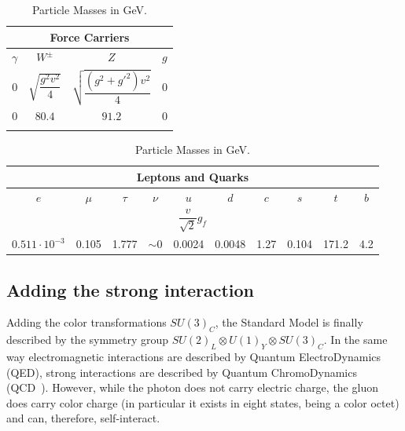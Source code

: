 \begin{table}[htb]\centering
\begin{tabular}{cccc}\toprule
\multicolumn{4}{c}{Force Carriers} \\ \midrule
$\gamma $ &$W^{\pm}$ &$Z$ &$g$ \\
$0$ & $\sqrt{\dfrac{g^{2}v^{2}}{4}} $& $\sqrt{\dfrac{(g^{2}+g'^{2})v^{2}}{4}} $&  $0$ \\
$0$ & $80.4$ & $91.2$ & $0$ \\\bottomrule\\
\end{tabular}
\begin{tabular}{cccccccccc}\toprule
\multicolumn{10}{c}{Leptons and Quarks} \\ \midrule
$e$ & $\mu$ &$\tau$ &$\nu$ & $u$ & $d$ & $c$ & $s$ &$ t$ & $b$ \\
\multicolumn{10}{c}{$\dfrac{v}{\sqrt{2}}g_{f}$} \\
$0.511\cdot10^{-3} $ & 0.105 & 1.777 & $\sim0$ & 0.0024 & 0.0048 & 1.27 & 0.104 & 171.2 & 4.2 \\\bottomrule
\end{tabular}\caption{Particle Masses in GeV.}\label{tab:mass} \end{table}


\subsection{Adding the strong interaction}\label{sec:qcdlagr}

Adding the color transformations $SU(3)_{C}$, the Standard Model is
finally described by the symmetry group 
$SU(2)_{L}\otimes U(1)_{Y}\otimes SU(3)_{C}$.
In the same way electromagnetic interactions are 
described by Quantum ElectroDynamics (QED), 
strong interactions are described by Quantum ChromoDynamics (QCD~\cite{Ecker}).
However, while the photon does not carry electric charge,
the gluon does carry color charge (in particular it exists in
eight states, being a color octet) and can, therefore, self-interact.

